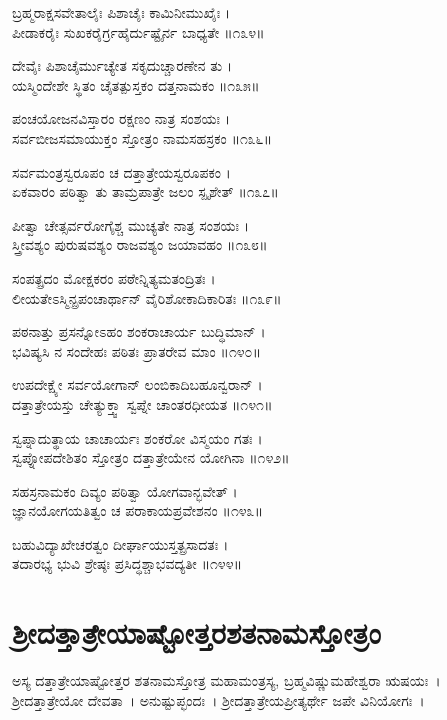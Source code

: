 ಬ್ರಹ್ಮರಾಕ್ಷಸವೇತಾಲೈಃ ಪಿಶಾಚೈಃ ಕಾಮಿನೀಮುಖೈಃ ।\\
ಪೀಡಾಕರೈಃ ಸುಖಕರೈರ್ಗ್ರಹೈರ್ದುಷ್ಟೈರ್ನ ಬಾಧ್ಯತೇ ॥೧೩೪॥

ದೇವೈಃ ಪಿಶಾಚೈರ್ಮುಚ್ಯೇತ ಸಕೃದುಚ್ಚಾರಣೇನ ತು ।\\
ಯಸ್ಮಿಂದೇಶೇ ಸ್ಥಿತಂ ಚೈತತ್ಪುಸ್ತಕಂ ದತ್ತನಾಮಕಂ ॥೧೩೫॥

ಪಂಚಯೋಜನವಿಸ್ತಾರಂ ರಕ್ಷಣಂ ನಾತ್ರ ಸಂಶಯಃ ।\\
ಸರ್ವಬೀಜಸಮಾಯುಕ್ತಂ ಸ್ತೋತ್ರಂ ನಾಮಸಹಸ್ರಕಂ ॥೧೩೬॥

ಸರ್ವಮಂತ್ರಸ್ವರೂಪಂ ಚ ದತ್ತಾತ್ರೇಯಸ್ವರೂಪಕಂ ।\\
ಏಕವಾರಂ ಪಠಿತ್ವಾ ತು ತಾಮ್ರಪಾತ್ರೇ ಜಲಂ ಸ್ಪೃಶೇತ್ ॥೧೩೭॥

ಪೀತ್ವಾ ಚೇತ್ಸರ್ವರೋಗೈಶ್ಚ ಮುಚ್ಯತೇ ನಾತ್ರ ಸಂಶಯಃ ।\\
ಸ್ತ್ರೀವಶ್ಯಂ ಪುರುಷವಶ್ಯಂ ರಾಜವಶ್ಯಂ ಜಯಾವಹಂ ॥೧೩೮॥

ಸಂಪತ್ಪ್ರದಂ ಮೋಕ್ಷಕರಂ ಪಠೇನ್ನಿತ್ಯಮತಂದ್ರಿತಃ ।\\
ಲೀಯತೇಽಸ್ಮಿನ್ಪ್ರಪಂಚಾರ್ಥಾನ್ ವೈರಿಶೋಕಾದಿಕಾರಿತಃ ॥೧೩೯॥

ಪಠನಾತ್ತು ಪ್ರಸನ್ನೋಽಹಂ ಶಂಕರಾಚಾರ್ಯ ಬುದ್ಧಿಮಾನ್ ।\\
ಭವಿಷ್ಯಸಿ ನ ಸಂದೇಹಃ ಪಠಿತಃ ಪ್ರಾತರೇವ ಮಾಂ ॥೧೪೦॥

ಉಪದೇಕ್ಷ್ಯೇ ಸರ್ವಯೋಗಾನ್ ಲಂಬಿಕಾದಿಬಹೂನ್ವರಾನ್ ।\\
ದತ್ತಾತ್ರೇಯಸ್ತು ಚೇತ್ಯುಕ್ತ್ವಾ ಸ್ವಪ್ನೇ ಚಾಂತರಧೀಯತ ॥೧೪೧॥

ಸ್ವಪ್ನಾದುತ್ಥಾಯ ಚಾಚಾರ್ಯಃ ಶಂಕರೋ ವಿಸ್ಮಯಂ ಗತಃ ।\\
ಸ್ವಪ್ನೋಪದೇಶಿತಂ ಸ್ತೋತ್ರಂ ದತ್ತಾತ್ರೇಯೇನ ಯೋಗಿನಾ ॥೧೪೨॥

ಸಹಸ್ರನಾಮಕಂ ದಿವ್ಯಂ ಪಠಿತ್ವಾ ಯೋಗವಾನ್ಭವೇತ್ ।\\
ಜ್ಞಾನಯೋಗಯತಿತ್ವಂ ಚ ಪರಾಕಾಯಪ್ರವೇಶನಂ ॥೧೪೩॥

ಬಹುವಿದ್ಯಾಖೇಚರತ್ವಂ ದೀರ್ಘಾಯುಸ್ತತ್ಪ್ರಸಾದತಃ ।\\
ತದಾರಭ್ಯ ಭುವಿ ಶ್ರೇಷ್ಠಃ ಪ್ರಸಿದ್ಧಶ್ಚಾಭವದ್ಯತೀ ॥೧೪೪॥

\section{ಶ್ರೀದತ್ತಾತ್ರೇಯಾಷ್ಟೋತ್ತರಶತನಾಮಸ್ತೋತ್ರಂ}
ಅಸ್ಯ ದತ್ತಾತ್ರೇಯಾಷ್ಟೋತ್ತರ ಶತನಾಮಸ್ತೋತ್ರ ಮಹಾಮಂತ್ರಸ್ಯ, ಬ್ರಹ್ಮವಿಷ್ಣುಮಹೇಶ್ವರಾ ಋಷಯಃ~। ಶ್ರೀದತ್ತಾತ್ರೇಯೋ ದೇವತಾ~। ಅನುಷ್ಟುಪ್ಛಂದಃ~। ಶ್ರೀದತ್ತಾತ್ರೇಯಪ್ರೀತ್ಯರ್ಥೇ ಜಪೇ ವಿನಿಯೋಗಃ~।\\

